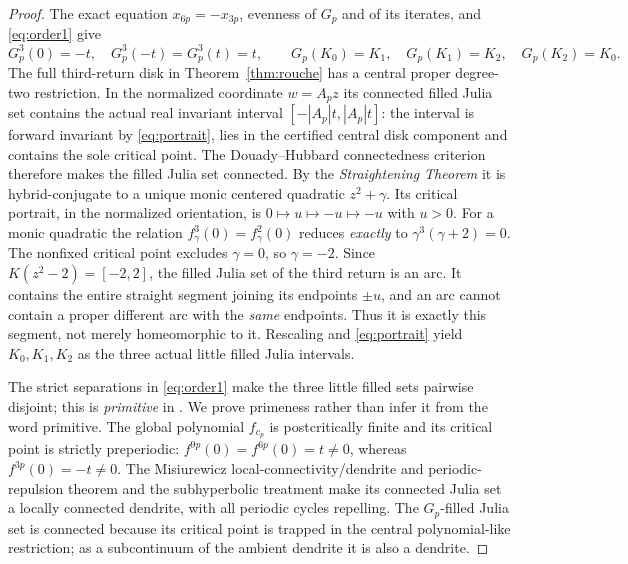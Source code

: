 \begin{proof}
The exact equation $x_{6p}=-x_{3p}$,
evenness of $G_p$ and of its iterates,
and \eqref{eq:order1} give
\begin{equation}\label{eq:portrait}
 G_p^3(0)=-t,\quad G_p^3(-t)=G_p^3(t)=t,\qquad
 G_p(K_0)=K_1,\quad G_p(K_1)=K_2,\quad
 G_p(K_2)=K_0.
\end{equation}
The full third-return disk in Theorem~\ref{thm:rouche}
has a central proper degree-two restriction.
In the normalized coordinate $w=A_pz$ its
connected filled Julia set contains the actual
real invariant interval $[-|A_p|t,|A_p|t]$:
the interval is forward invariant by \eqref{eq:portrait},
lies in the certified central disk component and
contains the sole critical point.  The Douady--Hubbard
connectedness criterion
\cite[Proposition 2]{DH1985} therefore makes the
filled Julia set connected.  By the
\emph{Straightening Theorem}
\cite[Theorem 1]{DH1985} it is hybrid-conjugate
to a unique monic centered quadratic $z^2+\gamma$.
Its critical portrait, in the normalized orientation,
is $0\mapsto u\mapsto -u\mapsto -u$ with $u>0$.
For a monic quadratic the relation
$f_\gamma^3(0)=f_\gamma^2(0)$ reduces
\emph{exactly} to $\gamma^3(\gamma+2)=0$.
The nonfixed critical point excludes $\gamma=0$,
so $\gamma=-2$.  Since $K(z^2-2)=[-2,2]$,
the filled Julia set of the third return is an arc.
It contains the entire straight segment joining
its endpoints $\pm u$, and an arc cannot contain
a proper different arc with the \emph{same}
endpoints.  Thus it is exactly this segment,
not merely homeomorphic to it.  Rescaling and
\eqref{eq:portrait} yield $K_0,K_1,K_2$ as
the three actual little filled Julia intervals.

The strict separations in \eqref{eq:order1}
make the three little filled sets pairwise
disjoint; this is \emph{primitive}
in \cite[\S2.3]{KKL2026}.  We prove primeness
rather than infer it from the word primitive.
The global polynomial $f_{c_p}$ is postcritically
finite and its critical point is strictly
preperiodic: $f^{9p}(0)=f^{6p}(0)=t\ne0$,
whereas $f^{3p}(0)=-t\ne0$.
The Misiurewicz local-connectivity/dendrite and
periodic-repulsion theorem
\cite[Theorem 27.4]{LyubichNotes}
and the subhyperbolic treatment
\cite[\S17]{Milnor2006} make its connected
Julia set a locally connected dendrite,
with all periodic cycles repelling.
The $G_p$-filled Julia set is connected
because its critical point is trapped in
the central polynomial-like restriction;
as a subcontinuum of the ambient dendrite
it is also a dendrite.


\end{proof}
